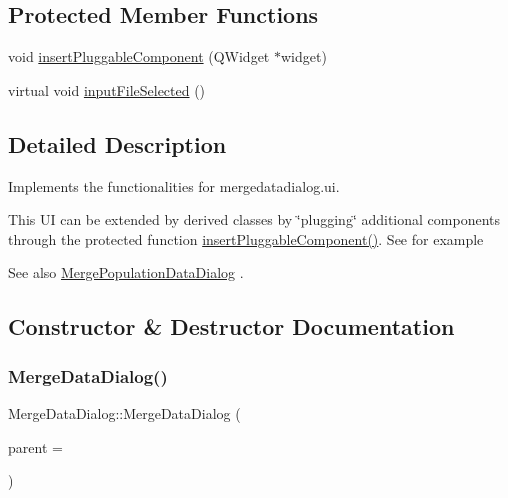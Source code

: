 \subsection*{Protected Member Functions}
\begin{DoxyCompactItemize}
\item 
void \mbox{\hyperlink{class_merge_data_dialog_a1a84240e7c77154c6247a803bea66187}{insert\+Pluggable\+Component}} (Q\+Widget $\ast$widget)
\item 
virtual void \mbox{\hyperlink{class_merge_data_dialog_a88635c995b69051e1583b5e244ee7cc4}{input\+File\+Selected}} ()
\end{DoxyCompactItemize}


\subsection{Detailed Description}
Implements the functionalities for mergedatadialog.\+ui. 

This UI can be extended by derived classes by \char`\"{}plugging\char`\"{} additional components through the protected function \mbox{\hyperlink{class_merge_data_dialog_a1a84240e7c77154c6247a803bea66187}{insert\+Pluggable\+Component()}}. See for example \begin{DoxySeeAlso}{See also}
\mbox{\hyperlink{class_merge_population_data_dialog}{Merge\+Population\+Data\+Dialog}} . 
\end{DoxySeeAlso}


\subsection{Constructor \& Destructor Documentation}
\mbox{\label{class_merge_data_dialog_a73917eefce32e627e8bee559812d1d65}} 
\subsubsection{\texorpdfstring{MergeDataDialog()}{MergeDataDialog()}}
{\footnotesize\ttfamily Merge\+Data\+Dialog\+::\+Merge\+Data\+Dialog (\begin{DoxyParamCaption}\item[{Q\+Widget $\ast$}]{parent = {} }\end{DoxyParamCaption})\hspace{0.3cm}{\ttfamily [explicit]}}

